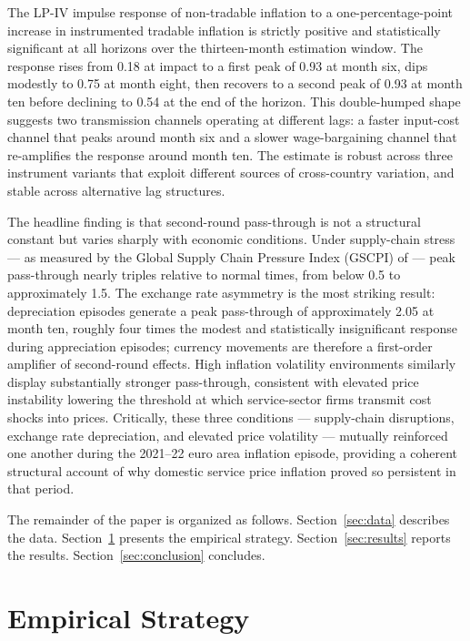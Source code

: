 The LP-IV impulse response of non-tradable inflation to a one-percentage-point
increase in instrumented tradable inflation is strictly positive and statistically
significant at all horizons over the thirteen-month estimation window.
The response rises from 0.18 at impact to a first peak of 0.93 at month six, dips
modestly to 0.75 at month eight, then recovers to a second peak of 0.93 at month ten
before declining to 0.54 at the end of the horizon.
This double-humped shape suggests two transmission channels operating at different lags:
a faster input-cost channel that peaks around month six and a slower wage-bargaining
channel that re-amplifies the response around month ten.
The estimate is robust across three instrument variants that exploit different sources of
cross-country variation, and stable across alternative lag structures.

The headline finding is that second-round pass-through is not a structural constant but
varies sharply with economic conditions.
Under supply-chain stress --- as measured by the Global Supply Chain Pressure Index
(GSCPI) of \citet{benigno2022} --- peak pass-through nearly triples relative to normal
times, from below 0.5 to approximately 1.5.
The exchange rate asymmetry is the most striking result: depreciation episodes generate
a peak pass-through of approximately 2.05 at month ten, roughly four times the modest
and statistically insignificant response during appreciation episodes; currency movements
are therefore a first-order amplifier of second-round effects.
High inflation volatility environments similarly display substantially stronger
pass-through, consistent with elevated price instability lowering the threshold at which
service-sector firms transmit cost shocks into prices.
Critically, these three conditions --- supply-chain disruptions, exchange rate
depreciation, and elevated price volatility --- mutually reinforced one another during
the 2021--22 euro area inflation episode, providing a coherent structural account of why
domestic service price inflation proved so persistent in that period.

The remainder of the paper is organized as follows.
Section~\ref{sec:data} describes the data.
Section~\ref{sec:strategy} presents the empirical strategy.
Section~\ref{sec:results} reports the results.
Section~\ref{sec:conclusion} concludes.

\section{Empirical Strategy}\label{sec:strategy}


